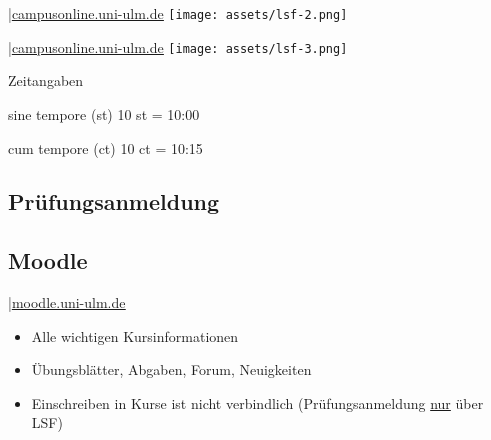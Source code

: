 \documentclass[
	aspectratio=169, 
	8pt 
]{beamer}
\newcommand*\annotatedFigureBoxCustom[8]{\draw[#5,thick,rounded corners] (#1) rectangle (#2);\node at (#4) [fill=#6,thick,shape=circle,draw=#7,inner sep=2pt,font=\sffamily,text=#8] {\textbf{#3}};}
\newcommand*\annotatedFigureBox[4]{\annotatedFigureBoxCustom{#1}{#2}{#3}{#4}{black}{white}{black}{black}}
\newenvironment {annotatedFigure}[1]{\centering\begin{tikzpicture}
    \node[anchor=south west,inner sep=0] (image) at (0,0) { #1};\begin{scope}[x={(image.south east)},y={(image.north west)}]}{\end{scope}\end{tikzpicture}}
\begin{document}
\begin{frame}{\insertsubsection \space|\space\underline{\href{https://campusonline.uni-ulm.de}{campusonline.uni-ulm.de}}}
    \texttt{[image: assets/lsf-2.png]}
\end{frame}

\begin{frame}{\insertsubsection \space|\space\underline{\href{https://campusonline.uni-ulm.de}{campusonline.uni-ulm.de}}}
    \texttt{[image: assets/lsf-3.png]}
\end{frame}

\begin{frame}{Zeitangaben}
    \begin{fancycolumns}
        \begin{definition}{sine tempore (st)}
            10 st = 10:00
        \end{definition}
        \nextcolumn
        \begin{definition}{cum tempore (ct)}
            10 ct = 10:15
        \end{definition}
    \end{fancycolumns}
\end{frame}

\subsection{Prüfungsanmeldung}

\subsection{Moodle}
\begin{frame}{\insertsubsection \space|\space\underline{\href{https://moodle.uni-ulm.de}{moodle.uni-ulm.de}}}
    \begin{itemize}
        \item Alle wichtigen Kursinformationen 
        \item Übungsblätter, Abgaben, Forum, Neuigkeiten
        \item Einschreiben in Kurse ist nicht verbindlich (Prüfungsanmeldung \underline{nur} über LSF)
    \end{itemize}
\end{frame}
\end{document}
